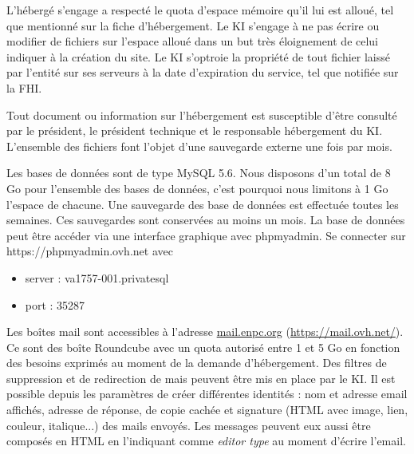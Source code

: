 \documentclass{ki019}
\begin{document}

L'hébergé s'engage a respecté le quota d'espace mémoire qu'il lui est alloué, tel que mentionné sur la fiche d'hébergement.
Le KI s'engage à ne pas écrire ou modifier de fichiers sur l'espace alloué dans un but très éloignement de celui indiquer à la création du site.
Le KI s'optroie la propriété de tout fichier laissé par l'entité sur ses serveurs à la date d'expiration du service, tel que notifiée sur la FHI.


Tout document ou information sur l'hébergement est susceptible d'être consulté par le président, le président technique et le responsable hébergement du KI.
L'ensemble des fichiers font l'objet d'une sauvegarde externe une fois par mois.


Les bases de données sont de type MySQL 5.6. Nous disposons d'un total de 8 Go pour l'ensemble des bases de données, c'est pourquoi nous limitons à 1 Go l'espace de chacune.
Une sauvegarde des base de données est effectuée toutes les semaines. Ces sauvegardes sont conservées au moins un mois.
La base de données peut être accéder via une interface graphique avec phpmyadmin.
Se connecter sur https://phpmyadmin.ovh.net avec
\begin{itemize}
\item server : va1757-001.privatesql
\item port : 35287
\end{itemize}


Les boîtes mail sont accessibles à l'adresse \url{mail.enpc.org} (\url{https://mail.ovh.net/}).
Ce sont des boîte Roundcube avec un quota autorisé entre 1 et 5 Go en fonction des besoins exprimés au moment de la demande d'hébergement.
Des filtres de suppression et de redirection de mais peuvent être mis en place par le KI.
Il est possible depuis les paramètres de créer différentes identités : nom et adresse email affichés, adresse de réponse, de copie cachée et signature (HTML avec image, lien, couleur, italique...) des mails envoyés.
Les messages peuvent eux aussi être composés en HTML en l'indiquant comme \textit{editor type} au moment d'écrire l'email.


\end{document}

